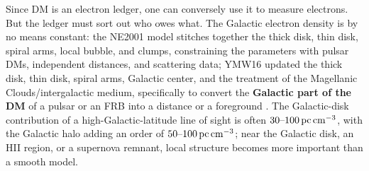 Since DM is an electron ledger, one can conversely use it to measure electrons. But the ledger must sort out who owes what. The Galactic electron density is by no means constant: the NE2001 model stitches together the thick disk, thin disk, spiral arms, local bubble, and clumps, constraining the parameters with pulsar DMs, independent distances, and scattering data; YMW16 updated the thick disk, thin disk, spiral arms, Galactic center, and the treatment of the Magellanic Clouds/intergalactic medium, specifically to convert the \textbf{Galactic part of the DM} of a pulsar or an FRB into a distance or a foreground \citep{2002astro.ph..7156C,2017ApJ...835...29Y}. The Galactic-disk contribution of a high-Galactic-latitude line of sight is often \(30\text{--}100\,{\rm pc\,cm^{-3}}\), with the Galactic halo adding an order of \(50\text{--}100\,{\rm pc\,cm^{-3}}\); near the Galactic disk, an HII region, or a supernova remnant, local structure becomes more important than a smooth model.

